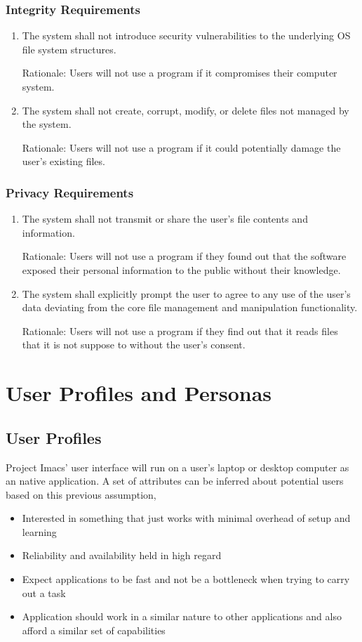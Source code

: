 \documentclass{article}
\begin{document}
\subsubsection{Integrity Requirements}
\begin{enumerate}[{I}NT1]
    \item The system shall not introduce security vulnerabilities to the underlying OS file system structures.

	Rationale: Users will not use a program if it compromises their computer system.
    \item The system shall not create, corrupt, modify, or delete files not managed by the system.

	Rationale: Users will not use a program if it could potentially damage the user's existing files.
\end{enumerate}

\subsubsection{Privacy Requirements}
\begin{enumerate}[PR{I}1]
    \item The system shall not transmit or share the user's file contents and information.

	Rationale: Users will not use a program if they found out that the software exposed their personal information to the public without their knowledge.
    \item The system shall explicitly prompt the user to agree to any use of the user's data deviating from the core file management and manipulation functionality.

	Rationale: Users will not use a program if they find out that it reads files that it is not suppose to without the user's consent.
\end{enumerate}

\section{User Profiles and Personas}
\subsection{User Profiles}
Project Imacs' user interface will run on a user's laptop or desktop computer as an
native application. A set of attributes can be inferred about potential users based on
this previous assumption,

\begin{itemize}
    \item Interested in something that just works with minimal overhead of setup and
        learning
    \item Reliability and availability held in high regard
    \item Expect applications to be fast and not be a bottleneck when trying to carry out
        a task
    \item Application should work in a similar nature to other applications and also
        afford a similar set of capabilities
\end{itemize}
\end{document}
